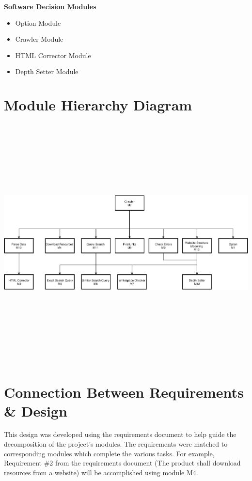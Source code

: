 \documentclass[titlepage]{article}
\begin{document}
\textbf{Software Decision Modules}

\begin{itemize}
\item{Option Module}\\
\item{Crawler Module}\\
\item{HTML Corrector Module}\\
\item{Depth Setter Module}\\
\end{itemize}



\section{Module Hierarchy Diagram}
\includegraphics[width=19cm, height=13cm]{UsesDiagram.png}


\section{Connection Between Requirements \& Design}

This design was developed using the requirements document to help guide the decomposition of the project's modules. The requirements were matched to corresponding modules which complete the various tasks. For example, Requirement \#2 from the requirements document (The product shall download resources from a website) will be accomplished using module M4.
\end{document}
